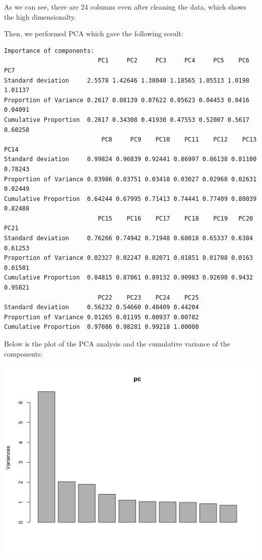 \documentclass[
  a4paperpaper,
  DIV=11,
  numbers=noendperiod]{scrartcl}
\begin{document}
As we can see, there are 24 columns even after cleaning the data, which
shows the high dimensionalty.

Then, we performed PCA which gave the following result:

\begin{verbatim}
Importance of components:
                          PC1     PC2     PC3     PC4     PC5    PC6     PC7
Standard deviation     2.5578 1.42646 1.38040 1.18565 1.05513 1.0198 1.01137
Proportion of Variance 0.2617 0.08139 0.07622 0.05623 0.04453 0.0416 0.04091
Cumulative Proportion  0.2617 0.34308 0.41930 0.47553 0.52007 0.5617 0.60258
                           PC8     PC9    PC10    PC11    PC12    PC13    PC14
Standard deviation     0.99824 0.96839 0.92441 0.86997 0.86138 0.81100 0.78243
Proportion of Variance 0.03986 0.03751 0.03418 0.03027 0.02968 0.02631 0.02449
Cumulative Proportion  0.64244 0.67995 0.71413 0.74441 0.77409 0.80039 0.82488
                          PC15    PC16    PC17    PC18    PC19   PC20    PC21
Standard deviation     0.76266 0.74942 0.71948 0.68018 0.65337 0.6384 0.61253
Proportion of Variance 0.02327 0.02247 0.02071 0.01851 0.01708 0.0163 0.01501
Cumulative Proportion  0.84815 0.87061 0.89132 0.90983 0.92690 0.9432 0.95821
                          PC22    PC23    PC24    PC25
Standard deviation     0.56232 0.54660 0.48409 0.44204
Proportion of Variance 0.01265 0.01195 0.00937 0.00782
Cumulative Proportion  0.97086 0.98281 0.99218 1.00000
\end{verbatim}

Below is the plot of the PCA analysis and the cumulative variance of the
components:

\includegraphics{Report_files/figure-pdf/unnamed-chunk-10-1.png}
\end{document}

